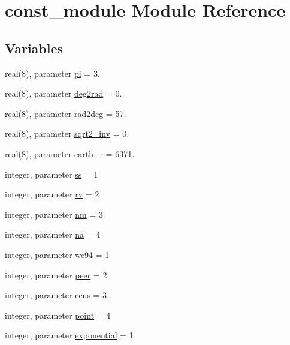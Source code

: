 \hypertarget{namespaceconst__module}{}\section{const\+\_\+module Module Reference}
\label{namespaceconst__module}
\subsection*{Variables}
\begin{DoxyCompactItemize}
\item 
real(8), parameter \hyperlink{namespaceconst__module_a6e2d7a0e80dfe577ca95736d3e143899}{pi} = 3.
\item 
real(8), parameter \hyperlink{namespaceconst__module_a87cf12ab3afb0ddc5f58492d1fb1d828}{deg2rad} = 0.
\item 
real(8), parameter \hyperlink{namespaceconst__module_a61843a48c8dec76293f423c682c8d772}{rad2deg} = 57.
\item 
real(8), parameter \hyperlink{namespaceconst__module_aa70be203aa6a91ce3961b81a6eae1e60}{sqrt2\+\_\+inv} = 0.
\item 
real(8), parameter \hyperlink{namespaceconst__module_ab766035166a55b031df25669f66e7b06}{earth\+\_\+r} = 6371.
\item 
integer, parameter \hyperlink{namespaceconst__module_afdf6c6b7ffea232bbc86b7ffef8298dc}{ss} = 1
\item 
integer, parameter \hyperlink{namespaceconst__module_a2fac1c74f2a81234dec392f6ad1c73ea}{rv} = 2
\item 
integer, parameter \hyperlink{namespaceconst__module_a45c7ab4515e2c0068ca69e5f4fed8a51}{nm} = 3
\item 
integer, parameter \hyperlink{namespaceconst__module_a437f551584bfdf420d4b28c829759eb5}{na} = 4
\item 
integer, parameter \hyperlink{namespaceconst__module_a760935a100ba2e8695aa777f582d5a61}{wc94} = 1
\item 
integer, parameter \hyperlink{namespaceconst__module_a28954bb32bf9368bbb5569a257603c57}{peer} = 2
\item 
integer, parameter \hyperlink{namespaceconst__module_a6d9b6ff754fe58527edcaea132c3d736}{ceus} = 3
\item 
integer, parameter \hyperlink{namespaceconst__module_aac415d96f710c33f0228284d6f5504c9}{point} = 4
\item 
integer, parameter \hyperlink{namespaceconst__module_a7b2347a542b2eda2b6841e1d9fdf19f4}{exponential} = 1

\end{DoxyCompactItemize}
